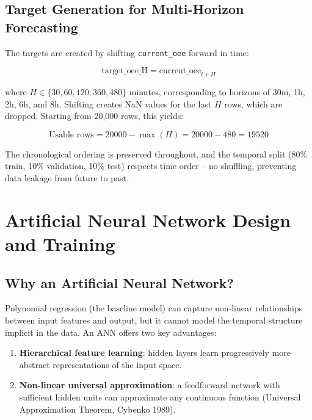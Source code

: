 \documentclass[a4paper,11pt]{article}
\begin{document}
\subsection{Target Generation for Multi-Horizon Forecasting}

The targets are created by shifting \texttt{current\_oee} forward in time:

\begin{equation}
\text{target\_oee\_H} = \text{current\_oee}_{t+H}
\end{equation}

where $H \in \{30, 60, 120, 360, 480\}$ minutes, corresponding to horizons of 30m, 1h, 2h, 6h, and 8h. Shifting creates NaN values for the last $H$ rows, which are dropped. Starting from 20,000 rows, this yields:

\begin{equation}
\text{Usable rows} = 20000 - \max(H) = 20000 - 480 = 19520
\end{equation}

The chronological ordering is preserved throughout, and the temporal split (80\% train, 10\% validation, 10\% test) respects time order -- no shuffling, preventing data leakage from future to past.

\section{Artificial Neural Network Design and Training}
\label{sec:ann}

\subsection{Why an Artificial Neural Network?}

Polynomial regression (the baseline model) can capture non-linear relationships between input features and output, but it cannot model the temporal structure implicit in the data. An ANN offers two key advantages:

\begin{enumerate}
    \item \textbf{Hierarchical feature learning}: hidden layers learn progressively more abstract representations of the input space.
    \item \textbf{Non-linear universal approximation}: a feedforward network with sufficient hidden units can approximate any continuous function (Universal Approximation Theorem, Cybenko 1989).
\end{enumerate}
\end{document}
